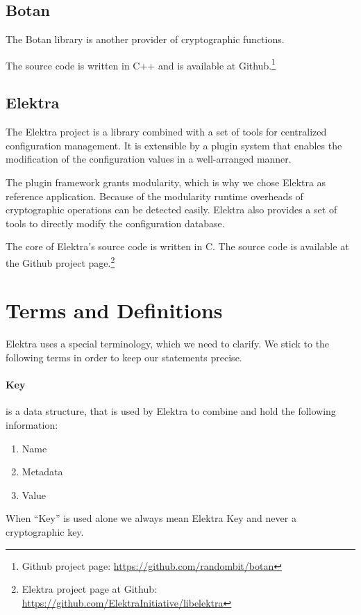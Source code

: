 	\subsection{Botan}

The Botan library is another provider of cryptographic functions.

The source code is written in C++ and is available at Github.\footnote{Github project page: \url{https://github.com/randombit/botan}}

	\subsection{Elektra}

The Elektra project is a library combined with a set of tools for centralized configuration management.
It is extensible by a plugin system that enables the modification of the configuration values in a well-arranged manner.\cite{raab2010thesis}

The plugin framework grants modularity, which is why we chose Elektra as reference application.
Because of the modularity runtime overheads of cryptographic operations can be detected easily.
Elektra also provides a set of tools to directly modify the configuration database.

The core of Elektra's source code is written in C.
The source code is available at the Github project page.\footnote{Elektra project page at Github: \url{https://github.com/ElektraInitiative/libelektra}}

\section{Terms and Definitions}

Elektra uses a special terminology, which we need to clarify.
We stick to the following terms in order to keep our statements precise.

\paragraph{Key} is a data structure, that is used by Elektra to combine and hold the following information:
\begin{enumerate}
  \item Name
  \item Metadata
  \item Value
\end{enumerate}
When ``Key'' is used alone we always mean Elektra Key and never a cryptographic key.


